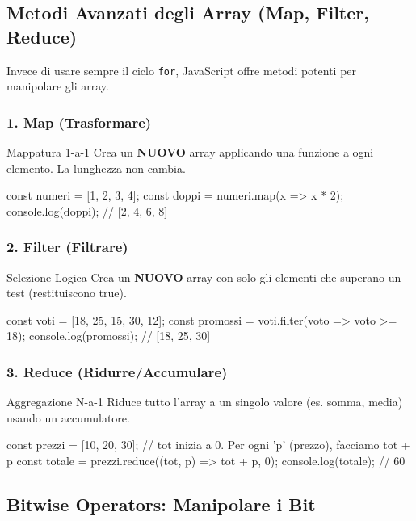 \subsection{Metodi Avanzati degli Array (Map, Filter, Reduce)}
Invece di usare sempre il ciclo \texttt{for}, JavaScript offre metodi potenti per manipolare gli array.

\subsubsection{1. Map (Trasformare)}
\begin{concept}{Mappatura 1-a-1}
Crea un \textbf{NUOVO} array applicando una funzione a ogni elemento. La lunghezza non cambia.
\end{concept}
\begin{jsbox}
const numeri = [1, 2, 3, 4];
const doppi = numeri.map(x => x * 2);
console.log(doppi); // [2, 4, 6, 8]
\end{jsbox}

\subsubsection{2. Filter (Filtrare)}
\begin{concept}{Selezione Logica}
Crea un \textbf{NUOVO} array con solo gli elementi che superano un test (restituiscono true).
\end{concept}
\begin{jsbox}
const voti = [18, 25, 15, 30, 12];
const promossi = voti.filter(voto => voto >= 18);
console.log(promossi); // [18, 25, 30]
\end{jsbox}

\subsubsection{3. Reduce (Ridurre/Accumulare)}
\begin{concept}{Aggregazione N-a-1}
Riduce tutto l'array a un singolo valore (es. somma, media) usando un accumulatore.
\end{concept}
\begin{jsbox}
const prezzi = [10, 20, 30];
// tot inizia a 0. Per ogni 'p' (prezzo), facciamo tot + p
const totale = prezzi.reduce((tot, p) => tot + p, 0);
console.log(totale); // 60
\end{jsbox}

\noindent\makebox[\linewidth]{\rule{\paperwidth}{0.4pt}}

\subsection{Bitwise Operators: Manipolare i Bit}

